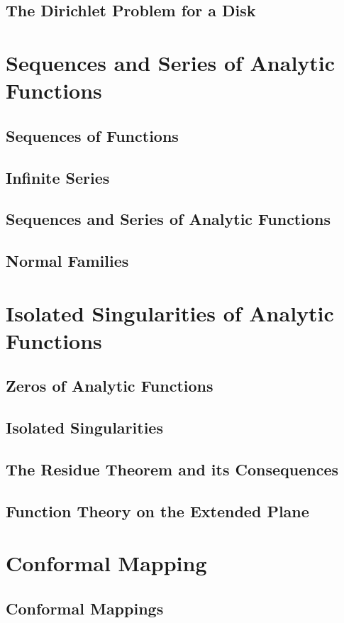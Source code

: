 \documentclass[11pt, a4paper, latinreim, shortsets]{notes}
\begin{document}
\begin{enumerate}[label={\bfseries II.5.\arabic*}]
\section{The Dirichlet Problem for a Disk}

\chapter{Sequences and Series of Analytic Functions}
\section{Sequences of Functions}
\section{Infinite Series}
\section{Sequences and Series of Analytic Functions}
\section{Normal Families}

\chapter{Isolated Singularities of Analytic Functions}
\section{Zeros of Analytic Functions}
\section{Isolated Singularities}
\section{The Residue Theorem and its Consequences}
\section{Function Theory on the Extended Plane}


\chapter{Conformal Mapping}
\section{Conformal Mappings}

\end{enumerate}
\end{document}
